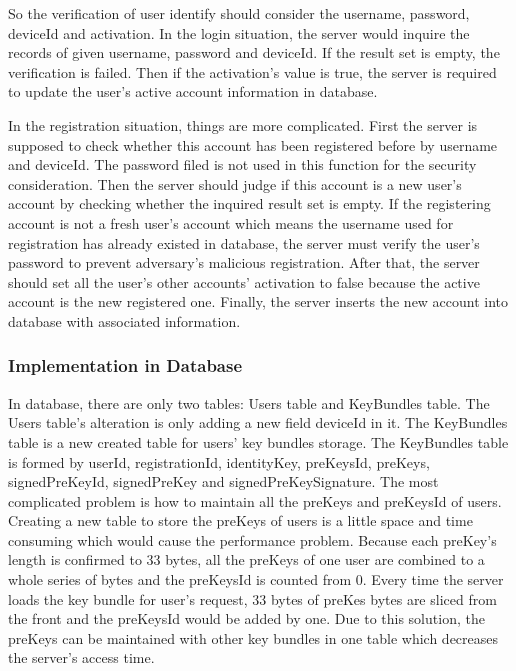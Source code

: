 \begin{enumerate}[label=(\roman*)]
So the verification of user identify should consider the username, password, deviceId and activation. In the login situation, the server would inquire the records of given username, password and deviceId. If the result set is empty, the verification is failed. Then if the activation's value is true, the server is required to update the user's active account information in database. 

In the registration situation, things are more complicated. First the server is supposed to check whether this account has been registered before by username and deviceId. The password filed is not used in this function for the security consideration. Then the server should judge if this account is a new user's account by checking whether the inquired result set is empty. If the registering account is not a fresh user's account which means the username used for registration has already existed in database, the server must verify the user's password to prevent adversary's malicious registration. After that, the server should set all the user's other accounts' activation to false because the active account is the new registered one. Finally, the server inserts the new account into database with associated information.
\end{enumerate}

\subsubsection{Implementation in Database}
In database, there are only two tables: Users table and KeyBundles table. The Users table's alteration is only adding a new field deviceId in it. The KeyBundles table is a new created table for users' key bundles storage. The KeyBundles table is formed by userId, registrationId, identityKey, preKeysId, preKeys, signedPreKeyId, signedPreKey and signedPreKeySignature. The most complicated problem is how to maintain all the preKeys and preKeysId of users. Creating a new table to store the preKeys of users is a little space and time consuming which would cause the performance problem. Because each preKey's length is confirmed to 33 bytes, all the preKeys of one user are combined to a whole series of bytes and the preKeysId is counted from 0. Every time the server loads the key bundle for user's request, 33 bytes of preKes bytes are sliced from the front and the preKeysId would be added by one. Due to this solution, the preKeys can be maintained with other key bundles in one table which decreases the server's access time.

